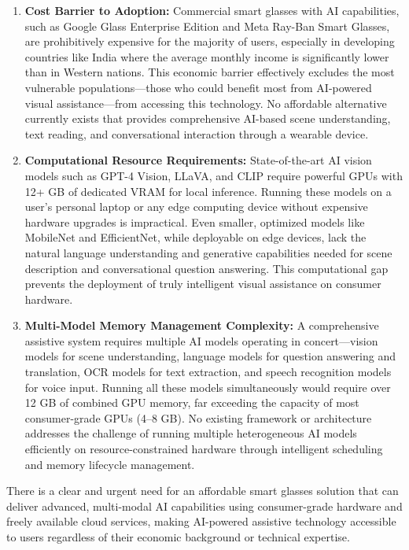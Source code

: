 \begin{enumerate}[leftmargin=1.5cm]
\item \textbf{Cost Barrier to Adoption:} Commercial smart glasses with AI capabilities, such as Google Glass Enterprise Edition and Meta Ray-Ban Smart Glasses, are prohibitively expensive for the majority of users, especially in developing countries like India where the average monthly income is significantly lower than in Western nations. This economic barrier effectively excludes the most vulnerable populations---those who could benefit most from AI-powered visual assistance---from accessing this technology. No affordable alternative currently exists that provides comprehensive AI-based scene understanding, text reading, and conversational interaction through a wearable device.

\item \textbf{Computational Resource Requirements:} State-of-the-art AI vision models such as GPT-4 Vision, LLaVA, and CLIP require powerful GPUs with 12+ GB of dedicated VRAM for local inference. Running these models on a user's personal laptop or any edge computing device without expensive hardware upgrades is impractical. Even smaller, optimized models like MobileNet and EfficientNet, while deployable on edge devices, lack the natural language understanding and generative capabilities needed for scene description and conversational question answering. This computational gap prevents the deployment of truly intelligent visual assistance on consumer hardware.

\item \textbf{Multi-Model Memory Management Complexity:} A comprehensive assistive system requires multiple AI models operating in concert---vision models for scene understanding, language models for question answering and translation, OCR models for text extraction, and speech recognition models for voice input. Running all these models simultaneously would require over 12 GB of combined GPU memory, far exceeding the capacity of most consumer-grade GPUs (4--8 GB). No existing framework or architecture addresses the challenge of running multiple heterogeneous AI models efficiently on resource-constrained hardware through intelligent scheduling and memory lifecycle management.
\end{enumerate}

There is a clear and urgent need for an affordable smart glasses solution that can deliver advanced, multi-modal AI capabilities using consumer-grade hardware and freely available cloud services, making AI-powered assistive technology accessible to users regardless of their economic background or technical expertise.

